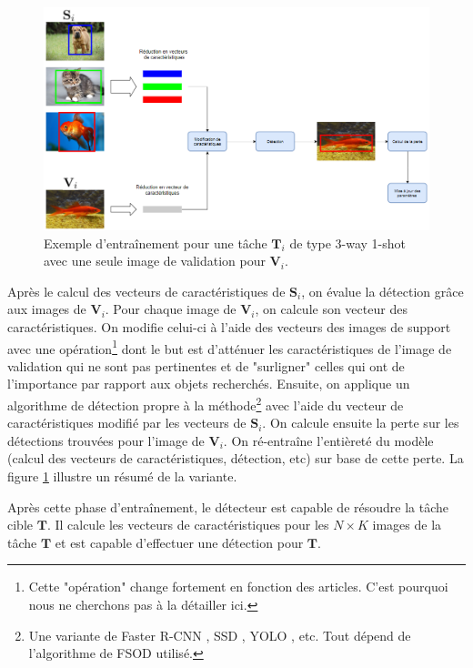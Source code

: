 \begin{figure}[!h]
\centering
\includegraphics[scale=0.5]{img/DML.PNG}
\caption{Exemple d'entraînement pour une tâche $\textbf{T}_i$ de type 3-way 1-shot avec une seule image de validation pour $\textbf{V}_i$.}
\label{fig:DML}
\end{figure}

Après le calcul des vecteurs de caractéristiques de $\textbf{S}_i$, on évalue la détection grâce aux images de $\textbf{V}_i$. Pour chaque image de $\textbf{V}_i$, on calcule son vecteur des caractéristiques. On modifie celui-ci à l'aide des vecteurs des images de support avec une opération\footnote{Cette "opération" change fortement en fonction des articles. C'est pourquoi nous ne cherchons pas à la détailler ici.} dont le but est d'atténuer les caractéristiques de l'image de validation qui ne sont pas pertinentes et de "surligner" celles qui ont de l'importance par rapport aux objets recherchés. Ensuite, on applique un algorithme de détection propre à la méthode\footnote{Une variante de Faster R-CNN \cite{Faster-R-CNN}, SSD \cite{SSD}, YOLO \cite{YOLO}, etc. Tout dépend de l'algorithme de FSOD utilisé.} avec l'aide du vecteur de caractéristiques modifié par les vecteurs de $\textbf{S}_i$. On calcule ensuite la perte sur les détections trouvées pour l'image de $\textbf{V}_i$. On ré-entraîne l'entièreté du modèle (calcul des vecteurs de caractéristiques, détection, etc) sur base de cette perte. La figure \ref{fig:DML} illustre un résumé de la variante.

Après cette phase d'entraînement, le détecteur est capable de résoudre la tâche cible $\textbf{T}$. Il calcule les vecteurs de caractéristiques pour les $N\times K$ images de la tâche $\textbf{T}$ et est capable d'effectuer une détection pour $\textbf{T}$.


